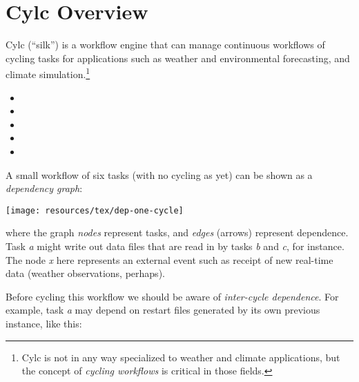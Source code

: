 \section{Cylc Overview}
\label{Cylc Overview}


Cylc (``silk'') is a workflow engine that can manage continuous workflows of
cycling tasks for applications such as weather and environmental
forecasting, and climate simulation.\footnote{Cylc is not in any way
specialized to weather and climate applications, but the concept of {\em
cycling workflows} is critical in those fields.}

\begin{itemize}
    \item {}
    \item {}
    \item {}
    \item {}
    \item {} 
\end{itemize}

A small workflow of six tasks (with no cycling as yet) can be shown as a {\em
dependency graph}:

\begin{center}
    \texttt{[image: resources/tex/dep-one-cycle]}
\end{center}

where the graph {\em nodes} represent tasks, and {\em edges} (arrows) represent
dependence.  Task {\em a} might write out data files that are read in by tasks
{\em b} and {\em c}, for instance.  The node {\em x} here represents an
external event such as receipt of new real-time data (weather observations,
perhaps).

Before cycling this workflow  we should be aware of {\em inter-cycle
dependence}.  For example, task {\em a} may depend on restart files generated
by its own previous instance, like this:

